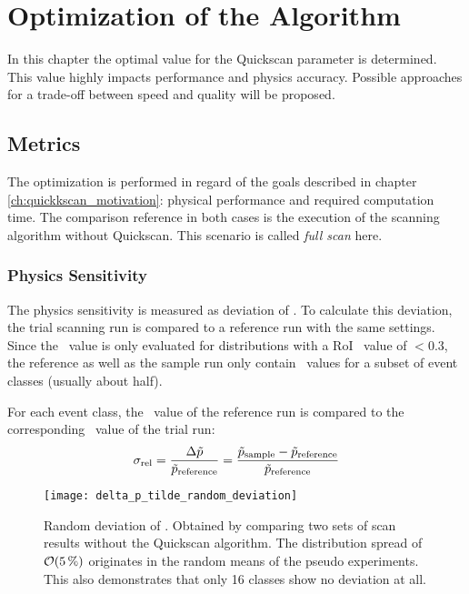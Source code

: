 
\chapter{Optimization of the Algorithm}
In this chapter the optimal value for the Quickscan parameter \paramregions is determined. This value highly impacts performance and physics accuracy. Possible approaches for a trade-off between speed and quality will be proposed.

\section{Metrics}
The optimization is performed in regard of the goals described in chapter \ref{ch:quickkscan_motivation}: physical performance and required computation time. The comparison reference in both cases is the execution of the scanning algorithm without Quickscan. This scenario is called \emph{full scan} here.

\subsection{Physics Sensitivity}
The physics sensitivity is measured as deviation of \ptilde. To calculate this deviation, the trial scanning run is compared to a reference run with the same settings. Since the \ptilde~value is only evaluated for distributions with a RoI \p~value of $< \num{0.3}$, the reference as well as the sample run only contain \ptilde~values for a subset of event classes (usually about half).

For each event class, the \ptilde~value of the reference run is compared to the corresponding \ptilde~value of the trial run:
\begin{equation}
	\sigma_\mathrm{rel} = \frac{\Delta \tilde{p}}{\tilde{p}_\mathrm{reference}} = \frac{\tilde{p}_\mathrm{sample} - \tilde{p}_\mathrm{reference}}{\tilde{p}_\mathrm{reference}}
\end{equation}

\begin{figure}[htbp]
	\centering
	\texttt{[image: delta\_p\_tilde\_random\_deviation]}
	\caption{Random deviation of \sigmarel. Obtained by comparing two sets of scan results without the Quickscan algorithm. The distribution spread of $\order{\SI{5}{\percent}}$ originates in the random means of the pseudo experiments. This also demonstrates that only \num{16} classes show no deviation at all.}
	\label{fig:delta_p_tilde_random_deviation}
\end{figure}

